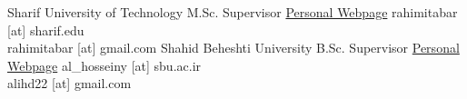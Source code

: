 \documentclass[9pt, purple]{./template/cv} %
\begin{document}
\vspace{-\baselineskip}
      {
      Sharif University of Technology
      }
      {
      M.Sc. Supervisor
      }
      {
      \href{http://sharif.edu/~rahimitabar/home_page.html}{Personal Webpage}
      }
      {
      rahimitabar [at] sharif.edu\\
      rahimitabar [at] gmail.com
      }
\vspace{-9.2\baselineskip} %
\hfill
{}
      {
      Shahid Beheshti University
      }
      {
      B.Sc. Supervisor
      }
      {
      \href{https://alihosseiny.com/}{Personal Webpage}
      }
      {
      al\_hosseiny [at] sbu.ac.ir\\
      alihd22 [at] gmail.com
      }
\end{document}

